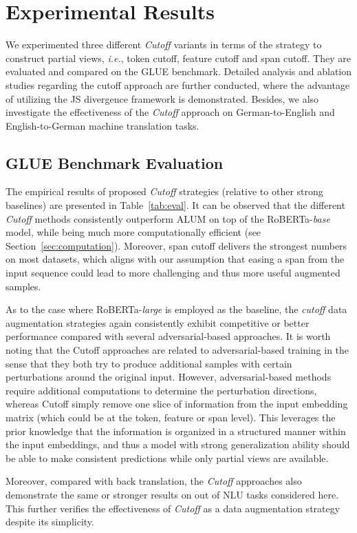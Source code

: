 \documentclass[11pt,a4paper]{article}
\begin{document}
\section{Experimental Results}
We experimented three different \emph{Cutoff} variants in terms of the strategy to construct partial views, \emph{i.e.}, token cutoff, feature cutoff and span cutoff. They are evaluated and compared on the GLUE benchmark. Detailed analysis and ablation studies regarding the cutoff approach are further conducted, where the advantage of utilizing the JS divergence framework is demonstrated. Besides, we also investigate the effectiveness of the \emph{Cutoff} approach on German-to-English and English-to-German machine translation tasks. 

\subsection{GLUE Benchmark Evaluation}
The empirical results of proposed \emph{Cutoff} strategies (relative to other strong baselines) are presented in Table~\ref{tab:eval}. It can be observed that the different \emph{Cutoff} methods consistently outperform ALUM on top of the RoBERTa-\emph{base} model, while being much more computationally efficient (see Section~\ref{sec:computation}). Moreover, span cutoff delivers the strongest numbers on most datasets, which aligns with our assumption that easing a span from the input sequence could lead to more challenging and thus more useful augmented samples. 

As to the case where RoBERTa-\emph{large} is employed as the baseline, the \emph{cutoff} data augmentation strategies again consistently exhibit competitive or better performance compared with several adversarial-based approaches. 
It is worth noting that the Cutoff approaches are related to adversarial-based training in the sense that they both try to produce additional samples with certain perturbations around the original input. However, adversarial-based methods require additional computations to determine the perturbation directions, whereas Cutoff simply remove one slice of information from  the input embedding matrix (which could be at the token, feature or span level). This leverages the prior knowledge that the information is organized in a structured manner within the input embeddings, and thus a model with strong generalization ability should be able to make consistent predictions while only partial views are available.

Moreover, compared with back translation, the \emph{Cutoff} approaches also demonstrate the same or stronger results on  out of  NLU tasks considered here. This further verifies the effectiveness of \emph{Cutoff} as a data augmentation strategy despite its simplicity.  
\end{document}
